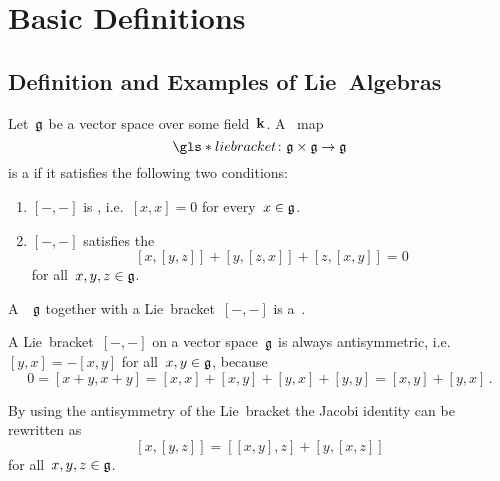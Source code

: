 \section{Basic Definitions}





\subsection{Definition and Examples of Lie~Algebras}


\begin{definition}
  Let~$\mathfrak{g}$ be a vector space over some field~$\kf$.
  A~{\bilinear{$\kf$}} map
  \[
    \gls*{lie bracket}
    \colon
    \glie \times \glie
    \to
    \glie
  \]
  is a  if it satisfies the following two conditions:
  \begin{enumerate}
    \item
    $[-, -]$ is , i.e.~$[x,x] = 0$ for every~$x \in \mathfrak{g}$.
    \item
    $[-, -]$ satisfies the 
    \[
      [x,[y,z]] + [y,[z,x]] + [z,[x,y]]
      =
      0
    \]
    for all~$x,y,z \in \mathfrak{g}$.
  \end{enumerate}
  A~{\vectorspace{$\kf$}}~$\mathfrak{g}$ together with a Lie~bracket~$[-,-]$ is a~.
\end{definition}


\begin{remark}
  A Lie~bracket~$[-, -]$ on a vector space~$\mathfrak{g}$ is always antisymmetric, i.e.~$[y,x] = -[x,y]$ for all~$x,y \in \mathfrak{g}$, because
  \[
    0
    =
    [x+y, x+y]
    =
    [x,x] + [x,y] + [y,x] + [y,y]
    =
    [x,y] + [y,x] \,.
  \]
\end{remark}


\begin{remark}
  By using the antisymmetry of the Lie~bracket the Jacobi identity can be rewritten as
  \[
    [x,[y,z]]
    =
    [[x,y],z] + [y,[x,z]]
  \]
  for all~$x, y, z \in \mathfrak{g}$.
\end{remark}


